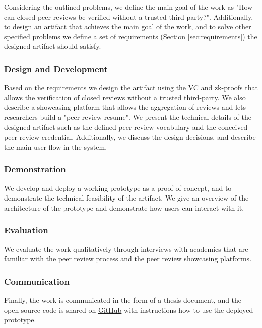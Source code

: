 Considering the outlined problems, we define the main goal of the work as "How can closed peer reviews be verified without a trusted-third party?". Additionally, to design an artifact that achieves the main goal of the work, and to solve other specified problems we define a set of requirements (Section \ref{sec:requirements}) the designed artifact should satisfy. 

\subsubsection{Design and Development}

Based on the requirements we design the artifact using the \acrlong{VC} and \acrlong{zk-proofs} that allows the verification of closed reviews without a trusted third-party. We also describe a showcasing platform that allows the aggregation of reviews and lets researchers build a "peer review resume". We present the technical details of the designed artifact such as the defined peer review vocabulary and the conceived peer review credential. Additionally, we discuss the design decisions, and describe the main user flow in the system. 

\subsubsection{Demonstration}

We develop and deploy a working prototype as a proof-of-concept, and to demonstrate the technical feasibility of the artifact. We give an overview of the architecture of the prototype and demonstrate how users can interact with it. 

\subsubsection{Evaluation}

We evaluate the work qualitatively through interviews with academics that are familiar with the peer review process and the peer review showcasing platforms.


\subsubsection{Communication}

Finally, the work is communicated in the form of a thesis document, and the open source code is shared on \href{https://github.com/kuzdogan/peer-review-verifiable-credentials-thesis}{GitHub} with instructions how to use the deployed prototype. 